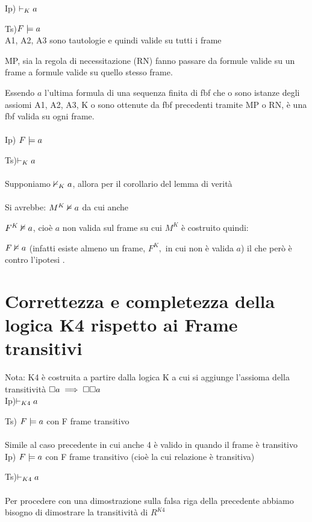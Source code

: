 Ip) $\vdash_{K}a$ 

Ts)$F\models a$\\


A1, A2, A3 sono tautologie e quindi valide su tutti i frame

MP, sia la regola di necessitazione (RN) fanno passare da formule
valide su un frame a formule valide su quello stesso frame. 

Essendo $a$ l’ultima formula di una sequenza finita di fbf che o
sono istanze degli assiomi A1, A2, A3, K o sono ottenute da fbf precedenti
tramite MP o RN, è una fbf valida su ogni frame.\\
\\
Ip) $F\models a$

Ts)$\vdash_{K}a$ \\
\\
Supponiamo $\nvdash_{K}a$, allora per il corollario del lemma di verità\\


 \\


Si avrebbe: $M^{K}\nvDash a$ da cui anche

$F^{K}\nvDash a$, cioè $a$ non valida sul frame su cui $M^{K}$
è costruito quindi:

$F\nvDash a$ (infatti esiste almeno un frame, $F^{K},$ in cui non
è valida $a$) il che però è contro l'ipotesi \lightning.


\section{Correttezza e completezza della logica K4 rispetto ai Frame transitivi}

Nota: K4 è costruita a partire dalla logica K a cui si aggiunge l'assioma
della transitività $\square a\implies\square\square a$ \\
Ip)$\vdash_{K4}a$ 

Ts) $F\models a$ con F frame transitivo\\
\\
Simile al caso precedente in cui anche 4 è valido in quando il frame
è transitivo\\


Ip) $F\models a$ con F frame transitivo (cioè la cui relazione è
transitiva)

Ts)$\vdash_{K4}a$\\
\\
Per procedere con una dimostrazione sulla falsa riga della precedente
abbiamo bisogno di dimostrare la transitività di $R^{K4}$

